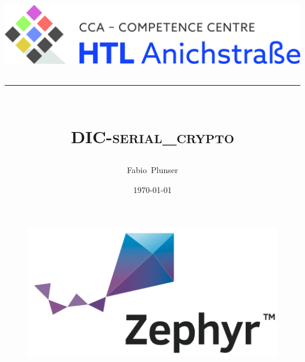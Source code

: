 \documentclass[12pt]{article}
\title{
  \vspace{-2cm}
  \centering
  \includegraphics[width=\linewidth]{htl-logo.jpg}\\
  \noindent\rule{\linewidth}{1pt}\\
  \vspace{50px}
  \Huge\textbf{\textsc{DIC-serial\_crypto}}
  \normalsize 
}
\author{Fabio~Plunser}
\date{\today}
\begin{document}

\begin{titlepage}
  \maketitle
  \begin{figure}[!htb]
    \centering
    \includegraphics[scale=1]{zephyr-logo.png}
    \label{zephyr-logo}
  \end{figure}

\end{titlepage}


\pagebreak
\thispagestyle{empty}
\renewcommand\contentsname{Inhaltsverzeichnis}
\tableofcontents	
{}


\thispagestyle{empty}
\renewcommand\listfigurename{Abbildungsverzeichnis}
\listoffigures
\renewcommand\lstlistlistingname{Code}
\lstlistoflistings
\end{document}

